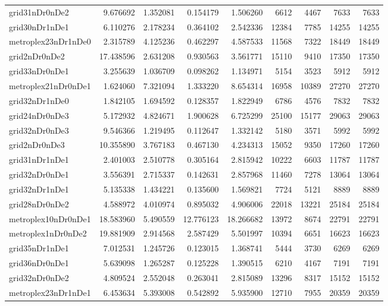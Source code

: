\begin{longtable}{|l|r|r|r|r|r|r|r|r|}
grid31nDr0nDe2 & 9.676692 & 1.352081 & 0.154179 & 1.506260 & 6612 & 4467 & 7633 & 7633 \\
grid30nDr1nDe1 & 6.110276 & 2.178234 & 0.364102 & 2.542336 & 12384 & 7785 & 14255 & 14255 \\
metroplex23nDr1nDe0 & 2.315789 & 4.125236 & 0.462297 & 4.587533 & 11568 & 7322 & 18449 & 18449 \\
grid2nDr0nDe2 & 17.438596 & 2.631208 & 0.930563 & 3.561771 & 15110 & 9410 & 17350 & 17350 \\
grid33nDr0nDe1 & 3.255639 & 1.036709 & 0.098262 & 1.134971 & 5154 & 3523 & 5912 & 5912 \\
metroplex21nDr0nDe1 & 1.624060 & 7.321094 & 1.333220 & 8.654314 & 16958 & 10389 & 27270 & 27270 \\
grid32nDr1nDe0 & 1.842105 & 1.694592 & 0.128357 & 1.822949 & 6786 & 4576 & 7832 & 7832 \\
grid24nDr0nDe3 & 5.172932 & 4.824671 & 1.900628 & 6.725299 & 25100 & 15177 & 29063 & 29063 \\
grid32nDr0nDe3 & 9.546366 & 1.219495 & 0.112647 & 1.332142 & 5180 & 3571 & 5992 & 5992 \\
grid2nDr0nDe3 & 10.355890 & 3.767183 & 0.467130 & 4.234313 & 15052 & 9350 & 17260 & 17260 \\
grid31nDr1nDe1 & 2.401003 & 2.510778 & 0.305164 & 2.815942 & 10222 & 6603 & 11787 & 11787 \\
grid32nDr0nDe1 & 3.556391 & 2.715337 & 0.142631 & 2.857968 & 11460 & 7278 & 13064 & 13064 \\
grid32nDr1nDe1 & 5.135338 & 1.434221 & 0.135600 & 1.569821 & 7724 & 5121 & 8889 & 8889 \\
grid28nDr0nDe2 & 4.588972 & 4.010974 & 0.895032 & 4.906006 & 22018 & 13221 & 25184 & 25184 \\
metroplex10nDr0nDe1 & 18.583960 & 5.490559 & 12.776123 & 18.266682 & 13972 & 8674 & 22791 & 22791 \\
metroplex1nDr0nDe2 & 19.881909 & 2.914568 & 2.587429 & 5.501997 & 10394 & 6651 & 16623 & 16623 \\
grid35nDr1nDe1 & 7.012531 & 1.245726 & 0.123015 & 1.368741 & 5444 & 3730 & 6269 & 6269 \\
grid36nDr0nDe1 & 5.639098 & 1.265287 & 0.125228 & 1.390515 & 6210 & 4167 & 7191 & 7191 \\
grid32nDr0nDe2 & 4.809524 & 2.552048 & 0.263041 & 2.815089 & 13296 & 8317 & 15152 & 15152 \\
metroplex23nDr1nDe1 & 6.453634 & 5.393008 & 0.542892 & 5.935900 & 12710 & 7955 & 20359 & 20359 \\

\end{longtable}

